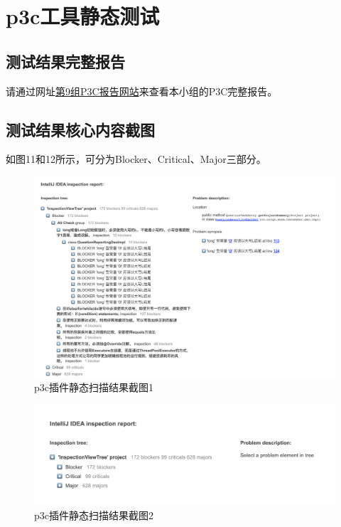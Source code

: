 \documentclass[hyperref, a4paper]{ctexart}
\begin{document}
\hypertarget{p3cux5de5ux5177ux9759ux6001ux6d4bux8bd5}{%
\section{p3c工具静态测试}\label{p3cux5de5ux5177ux9759ux6001ux6d4bux8bd5}}

\hypertarget{ux6d4bux8bd5ux7ed3ux679cux5b8cux6574ux62a5ux544a-1}{%
\subsection{测试结果完整报告}\label{ux6d4bux8bd5ux7ed3ux679cux5b8cux6574ux62a5ux544a-1}}

请通过网址\href{https://straybird-atsh.github.io/SoftwareQA-Testing/P3CReport.html}{第9组P3C报告网站}来查看本小组的P3C完整报告。

\hypertarget{ux6d4bux8bd5ux7ed3ux679cux6838ux5fc3ux5185ux5bb9ux622aux56fe-1}{%
\subsection{测试结果核心内容截图}\label{ux6d4bux8bd5ux7ed3ux679cux6838ux5fc3ux5185ux5bb9ux622aux56fe-1}}

如图11和12所示，可分为Blocker、Critical、Major三部分。

\begin{figure}
\centering
\includegraphics{screenshots/pic1.jpg}
\caption{p3c插件静态扫描结果截图1}
\end{figure}

\begin{figure}
\centering
\includegraphics{screenshots/pic2.jpg}
\caption{p3c插件静态扫描结果截图2}
\end{figure}
\end{document}
